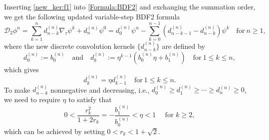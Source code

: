 \documentclass{m2an}
\newcommand{\md}{\mathcal{D}}
\begin{document}
Inserting \eqref{new_ker:f1} into \eqref{Formula:BDF2} and exchanging the summation order, we get the following  updated variable-step BDF2 formula
\begin{equation}\label{Formula:new_BDF2}
	\md_{2} \phi^n = \sum^{n}_{k=1} d^{(n)}_{n-k} \nabla_{\tau} \psi^{k} + d^{(n)}_{n} \psi^0 = d_0^{(n)} \psi^{n} - \sum^{n-1}_{k=0} ( d^{(n)}_{n-k-1} - d^{(n)}_{n-k} ) \psi^{k} \quad \text{for} \  n \geq 1,
\end{equation}
where the new discrete convolution kernels $ \{d^{(n)}_{n-k}\} $ are defined by
\begin{equation}\label{Formula:new_ker_1}
	d_0^{(n)} := b_0^{(n)} \quad \text{and} \quad  d_k^{(n)} := \eta^{k-1} (b_0^{(n)} \eta + b_1^{(n)} ) \quad \text{for} \  1 \leq k \leq n,
\end{equation}
which gives
\begin{equation}\label{Formula:new_ker_2}
	d_{k}^{(n)} = \eta d_{k-1}^{(n)} \quad \text{for} \  1 \leq k \leq n.
\end{equation}
To make $ d^{(n)}_{n-k} $ nonnegative and decreasing, i.e., $d_0^{(n)} \geq d_1^{(n)} \geq \cdots \geq d_n^{(n)} \geq 0$, we need to require $ \eta $ to satisfy that
\begin{equation}\label{Formula:eta}
	0 < \frac{r_k^2}{1+2 r_k} = - \frac{ b^{(n)}_{1} }{ b^{(n)}_0 } < \eta < 1 \quad \text { for } k \geq 2,
\end{equation}
which can be achieved by setting $ 0 < r_k < 1 + \sqrt{2} $.
\end{document}
